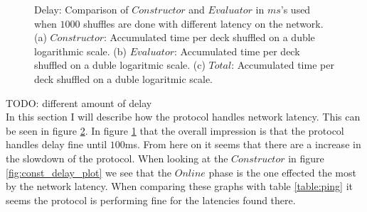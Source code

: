 \documentclass[twoside,11pt,openright]{report}
\newcommand{\todo}[1]{}
\renewcommand{\todo}[1]{{\color{red} TODO: {#1}} \\}
\begin{document}
\begin{figure}
    \begin{subfigure}{\textwidth}
        \centering
        \caption{}
        \label{fig:total_delay_plot}
    \end{subfigure}
    \caption{Delay: Comparison of $Constructor$ and $Evaluator$ in $ms$'s used when $1000$ shuffles are done with different latency on the network. (a) $Constructor$: Accumulated time per deck shuffled on a duble logarithmic scale. (b) $Evaluator$: Accumulated time per deck shuffled on a duble logaritmic scale. (c) $Total$: Accumulated time per deck shuffled on a duble logaritmic scale.}
    \label{fig:mesurement_delay}
\end{figure}

\todo{different amount of delay}
In this section I will describe how the protocol handles network latency. This can be seen in figure \ref{fig:mesurement_delay}. In figure \ref{fig:total_delay_plot} that the overall impression is that the protocol handles delay fine until $100$ms. From here on it seems that there are a increase in the slowdown of the protocol. When looking at the $Constructor$ in figure \ref{fig:const_delay_plot} we see that the $Online$ phase is the one effected the most by the network latency. When comparing these graphs with table \ref{table:ping} it seems the protocol is performing fine for the latencies found there.

\bigskip
\end{document}
